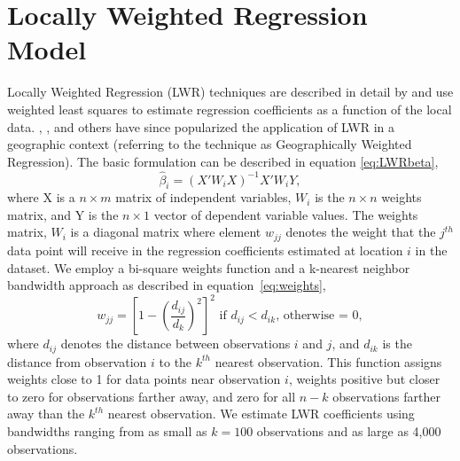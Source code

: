 \documentclass[leqno]{article}\usepackage[]{graphicx}\usepackage[]{color}
\begin{document}
\section{Locally Weighted Regression Model}
Locally Weighted Regression (LWR) techniques are described in detail by \citet{Cleveland1988} and use weighted least squares to estimate regression coefficients as a function of the local data. \citet{Brunsdon1998b}, \citet{Fotheringham2002}, and others have since popularized the application of LWR in a geographic context (referring to the technique as Geographically Weighted Regression). The basic formulation can be described in equation \eqref{eq:LWRbeta}, 
\begin{equation}\label{eq:LWRbeta}
\hat{\beta}_i = (X'W_iX)^{-1}X'W_iY,
\end{equation}
where X is a $n \times m$ matrix of independent variables, $W_i$ is the $n \times n$ weights matrix, and Y is the $n \times 1$ vector of dependent variable values. The weights matrix, $W_i$ is a diagonal matrix where element $w_{jj}$ denotes the weight that the $j^{th}$ data point will receive in the regression coefficients estimated at location $i$ in the dataset. We employ a bi-square weights function and a k-nearest neighbor bandwidth approach as described in equation~\eqref{eq:weights}, 
\begin{equation}\label{eq:weights}
w_{jj}=\left[1-\left(\frac{d_{ij}}{d_{k}}\right)^2 \right]^2 \textrm{ if  }d_{ij}<d_{ik}\textrm{, otherwise = 0},
\end{equation}
where $d_{ij}$ denotes the distance between observations $i$ and $j$, and $d_{ik}$ is the distance from observation $i$ to the $k^{th}$ nearest observation. This function assigns weights close to 1 for data points near observation $i$, weights positive but closer to zero for observations farther away, and zero for all $n-k$ observations farther away than the $k^{th}$ nearest observation. We estimate LWR coefficients using bandwidths ranging from as small as $k=100$ observations and as large as 4,000 observations. 
\end{document}
